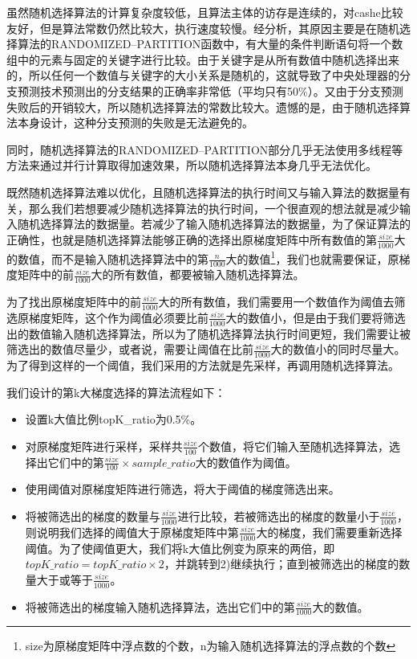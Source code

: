 虽然随机选择算法的计算复杂度较低，且算法主体的访存是连续的，对cashe比较友好，但是算法常数仍然比较大，执行速度较慢。经分析，其原因主要是在随机选择算法的RANDOMIZED--PARTITION函数中，有大量的条件判断语句将一个数组中的元素与固定的关键字进行比较。由于关键字是从所有数值中随机选择出来的，所以任何一个数值与关键字的大小关系是随机的，这就导致了中央处理器的分支预测技术预测出的分支结果的正确率非常低（平均只有50\%）。又由于分支预测失败后的开销较大，所以随机选择算法的常数比较大。遗憾的是，由于随机选择算法本身设计，这种分支预测的失败是无法避免的。

同时，随机选择算法的RANDOMIZED--PARTITION部分几乎无法使用多线程等方法来通过并行计算取得加速效果，所以随机选择算法本身几乎无法优化。

既然随机选择算法难以优化，且随机选择算法的执行时间又与输入算法的数据量有关，那么我们若想要减少随机选择算法的执行时间，一个很直观的想法就是减少输入随机选择算法的数据量。若减少了输入随机选择算法的数据量，为了保证算法的正确性，也就是随机选择算法能够正确的选择出原梯度矩阵中所有数值的第$\frac{size}{1000}$大的数值，而不是输入随机选择算法中的第$\frac{n}{1000}$大的数值\footnote{size为原梯度矩阵中浮点数的个数，n为输入随机选择算法的浮点数的个数}，我们也就需要保证，原梯度矩阵中的前$\frac{size}{1000}$大的所有数值，都要被输入随机选择算法。

为了找出原梯度矩阵中的前$\frac{size}{1000}$大的所有数值，我们需要用一个数值作为阈值去筛选原梯度矩阵，这个作为阈值必须要比前$\frac{size}{1000}$大的数值小，但是由于我们要将筛选出的数值输入随机选择算法，所以为了随机选择算法执行时间更短，我们需要让被筛选出的数值尽量少，或者说，需要让阈值在比前$\frac{size}{1000}$大的数值小的同时尽量大。为了得到这样的一个阈值，我们采用的方法就是先采样，再调用随机选择算法。

我们设计的第k大梯度选择的算法流程如下：
\begin{itemize}
  \item [1)]
  设置k大值比例topK\_ratio为0.5\%。
  \item [2)]
  对原梯度矩阵进行采样，采样共$\frac{size}{100}$个数值，将它们输入至随机选择算法，选择出它们中的第$\frac{size}{100}\times sample\_ratio$大的数值作为阈值。
  \item [3)]
  使用阈值对原梯度矩阵进行筛选，将大于阈值的梯度筛选出来。
  \item [4)]
  将被筛选出的梯度的数量与$\frac{size}{1000}$进行比较，若被筛选出的梯度的数量小于$\frac{size}{1000}$，则说明我们选择的阈值大于原梯度矩阵中第$\frac{size}{1000}$大的梯度，我们需要重新选择阈值。为了使阈值更大，我们将k大值比例变为原来的两倍，即$topK\_ratio = topK\_ratio \times 2$，并跳转到2)继续执行；直到被筛选出的梯度的数量大于或等于$\frac{size}{1000}$。
  \item [5)]
  将被筛选出的梯度输入随机选择算法，选出它们中的第$\frac{size}{1000}$大的数值。
\end{itemize}

